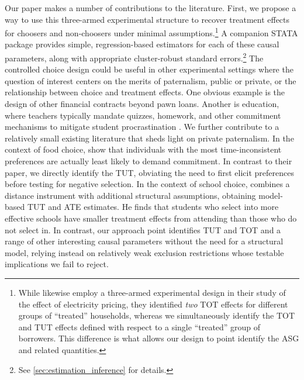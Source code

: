 \documentclass[12pt, a4paper]{article}
\begin{document}
Our paper makes a number of contributions to the literature. First, we propose a way to use this three-armed experimental structure to recover treatment effects for choosers and non-choosers under minimal assumptions.\footnote{While \cite{fowlie2021default} likewise employ a three-armed experimental design in their study of the effect of electricity pricing, they identified \emph{two} TOT effects for different groups of ``treated'' households, whereas we simultaneously identify the TOT and TUT effects defined with respect to a single ``treated'' group of borrowers. This difference is what allows our design to point identify the ASG and related quantities.} 
A companion STATA package provides simple, regression-based estimators for each of these causal parameters, along with appropriate cluster-robust standard errors.\footnote{See \autoref{sec:estimation_inference} for details.} 
The controlled choice design could be useful in other experimental settings where the question of interest centers on the merits of paternalism, public or private, or the relationship between choice and treatment effects. One obvious example is the design of other financial contracts beyond pawn loans. Another is education, where teachers typically mandate quizzes, homework, and other commitment mechanisms to mitigate student procrastination \citep{Ariely}. 
We further contribute to a relatively small existing literature that sheds light on private paternalism. In the context of food choice, \cite{Sprenger} show that individuals with the most time-inconsistent preferences are actually least likely to demand commitment. In contrast to their paper, we directly identify the TUT, obviating the need to first elicit preferences before testing for negative selection. In the context of school choice, \cite{Walters} combines a distance instrument with additional structural assumptions, obtaining model-based TUT and ATE estimates. He finds that students who select into more effective schools have smaller treatment effects from attending than those who do not select in. In contrast, our approach point identifies TUT and TOT and a range of other interesting causal parameters without the need for a structural model, relying instead on relatively weak exclusion restrictions whose testable implications we fail to reject.
\end{document}
